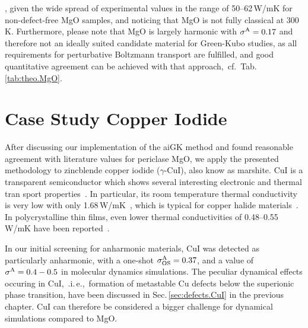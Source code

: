 , given the wide spread of experimental values in the range of 50--62\,W/mK for non-defect-free MgO samples, and noticing that MgO is not fully classical at 300\,K. Furthermore, please note that MgO is largely harmonic with $\sigma^\mathrm{A} = 0.17$ and therefore not an ideally suited candidate material for Green-Kubo studies, as all requirements for perturbative Boltzmann transport are fulfilled, and good quantitative agreement can be achieved with that approach,~cf.~Tab.\,\ref{tab:theo.MgO}.

\section{Case Study Copper Iodide}


After discussing our implementation of the aiGK method and found reasonable agreement with literature values for periclase MgO, we apply the presented methodology to zincblende copper iodide ($\gamma$-CuI), also know as marshite. CuI is a transparent semiconductor which shows several interesting electronic and thermal tran sport properties~. In particular, its room temperature thermal conductivity is very low with only 1.68\,W/mK~\cite{perry2016}, which is typical for copper halide materials~. In polycrystalline thin films, even lower thermal conductivities of 0.48--0.55\,W/mK have been reported~\cite{yang2017,coroa2019}.

In our initial screening for anharmonic materials, CuI was detected as particularly anharmonic, with a one-shot $\sigma^\mathrm{A}_\mathrm{OS} = 0.37$, and a value of $\sigma^\mathrm{A} = 0.4-0.5$ in molecular dynamics simulations. The peculiar dynamical effects occuring in CuI,~.i.\,e.,~formation of metastable Cu defects below the superionic phase transition, have been discussed in Sec.\,\ref{sec:defects.CuI} in the previous chapter. CuI can therefore be considered a bigger challenge for dynamical simulations compared to MgO.


